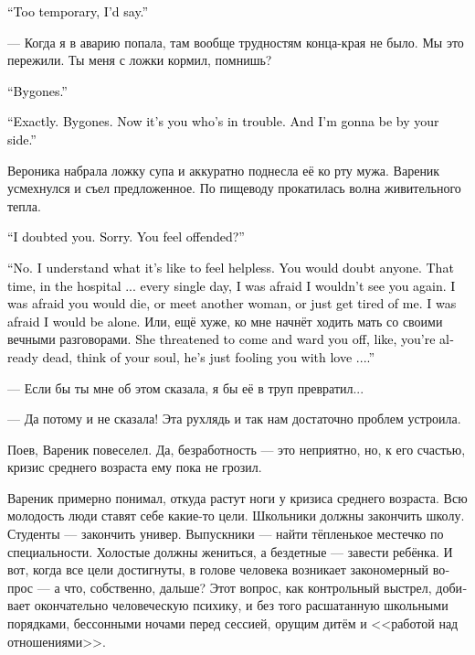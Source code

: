 \documentclass[a5paper,12pt,fleqn]{extbook}\usepackage{cooltooltips}\usepackage{polyglossia}\setdefaultlanguage[babelshorthands=true]{russian}\setotherlanguage{english}\defaultfontfeatures{Ligatures=TeX,Mapping=tex-text} \usepackage{xcolor}\definecolor{lightgray}{HTML}{bbbbbb}\color{lightgray}\newcommand{\ml}[3]{\textenglish{\textcolor{black}{#3}}}
\begin{document}
\ml{$0$}
{--- Да какие-то слишком временные.}
{``Too temporary, I'd say.''}

--- Когда я в аварию попала, там вообще трудностям конца-края не было.
Мы это пережили.
Ты меня с ложки кормил, помнишь?

\ml{$0$}
{--- Дело давнее.}
{``Bygones.''}

\ml{$0$}
{--- Именно.}
{``Exactly.}
\ml{$0$}
{Всё это позади.}
{Bygones.}
\ml{$0$}
{А сейчас трудности у тебя.}
{Now it's you who's in trouble.}
\ml{$0$}
{И я буду рядом.}
{And I'm gonna be by your side.''}

Вероника набрала ложку супа и аккуратно поднесла её ко рту мужа.
Вареник усмехнулся и съел предложенное.
По пищеводу прокатилась волна живительного тепла.

\ml{$0$}
{--- Я в тебе засомневался.}
{``I doubted you.}
\ml{$0$}
{Прости.}
{Sorry.}
\ml{$0$}
{Ты обиделась?}
{You feel offended?''}

\ml{$0$}
{--- Нет.}
{``No.}
\ml{$0$}
{Я знаю, каково чувствовать себя беспомощной.}
{I understand what it's like to feel helpless.}
\ml{$0$}
{Засомневаешься в ком угодно.}
{You would doubt anyone.}
\ml{$0$}
{Тогда, в больнице... я каждый день боялась, что тебя не дождусь.}
{That time, in the hospital ... every single day, I was afraid I wouldn't see you again.}
\ml{$0$}
{Что ты умрёшь, встретишь другую женщину, просто решишь, что я тебе надоела.}
{I was afraid you would die, or meet another woman, or just get tired of me.}
\ml{$0$}
{Что я просто останусь одна.}
{I was afraid I would be alone.}
Или, ещё хуже, ко мне начнёт ходить мать со своими вечными разговорами.
\ml{$0$}
{Она грозилась приехать и тебя отвадить, типа, ты уже труп, о душе думать надо, а он тебе голову любовью морочит...}
{She threatened to come and ward you off, like, you're already dead, think of your soul, he's just fooling you with love ....''}

--- Если бы ты мне об этом сказала, я бы её в труп превратил...

--- Да потому и не сказала!
Эта рухлядь и так нам достаточно проблем устроила.

Поев, Вареник повеселел.
Да, безработность --- это неприятно, но, к его счастью, кризис среднего возраста ему пока не грозил.

Вареник примерно понимал, откуда растут ноги у кризиса среднего возраста.
Всю молодость люди ставят себе какие-то цели.
Школьники должны закончить школу.
Студенты --- закончить универ.
Выпускники --- найти тёпленькое местечко по специальности.
Холостые должны жениться, а бездетные --- завести ребёнка.
И вот, когда все цели достигнуты, в голове человека возникает закономерный вопрос --- а что, собственно, дальше?
Этот вопрос, как контрольный выстрел, добивает окончательно человеческую психику, и без того расшатанную школьными порядками, бессонными ночами перед сессией, орущим дитём и <<работой над отношениями>>.
\end{document}
